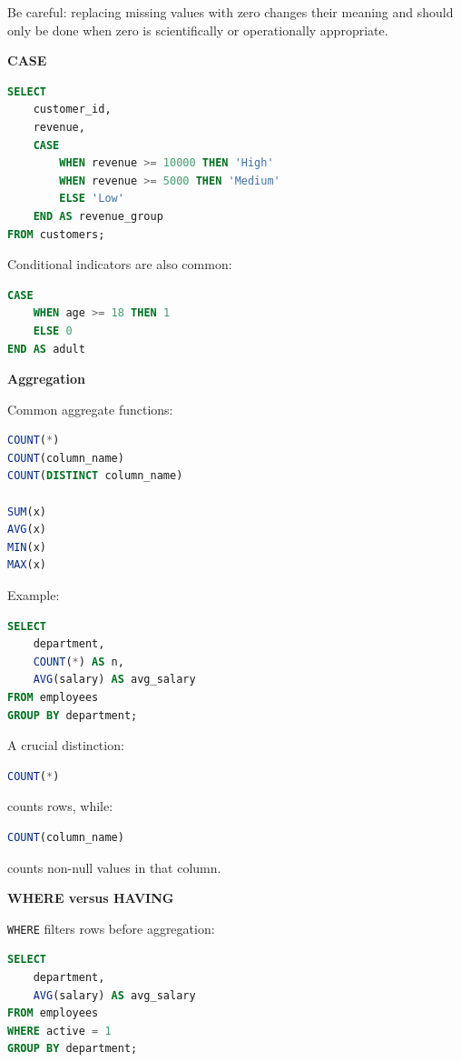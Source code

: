 \documentclass[11pt,letterpaper]{article}
\begin{document}
Be careful: replacing missing values with zero changes their meaning and
should only be done when zero is scientifically or operationally appropriate.

\textbf{CASE}

\begin{lstlisting}[language=SQL]
SELECT
    customer_id,
    revenue,
    CASE
        WHEN revenue >= 10000 THEN 'High'
        WHEN revenue >= 5000 THEN 'Medium'
        ELSE 'Low'
    END AS revenue_group
FROM customers;
\end{lstlisting}

Conditional indicators are also common:

\begin{lstlisting}[language=SQL]
CASE
    WHEN age >= 18 THEN 1
    ELSE 0
END AS adult
\end{lstlisting}

\textbf{Aggregation}

Common aggregate functions:

\begin{lstlisting}[language=SQL]
COUNT(*)
COUNT(column_name)
COUNT(DISTINCT column_name)

SUM(x)
AVG(x)
MIN(x)
MAX(x)
\end{lstlisting}

Example:

\begin{lstlisting}[language=SQL]
SELECT
    department,
    COUNT(*) AS n,
    AVG(salary) AS avg_salary
FROM employees
GROUP BY department;
\end{lstlisting}

A crucial distinction:

\begin{lstlisting}[language=SQL]
COUNT(*)
\end{lstlisting}

counts rows, while:

\begin{lstlisting}[language=SQL]
COUNT(column_name)
\end{lstlisting}

counts non-null values in that column.

\textbf{WHERE versus HAVING}

\texttt{WHERE} filters rows before aggregation:

\begin{lstlisting}[language=SQL]
SELECT
    department,
    AVG(salary) AS avg_salary
FROM employees
WHERE active = 1
GROUP BY department;
\end{lstlisting}
\end{document}
